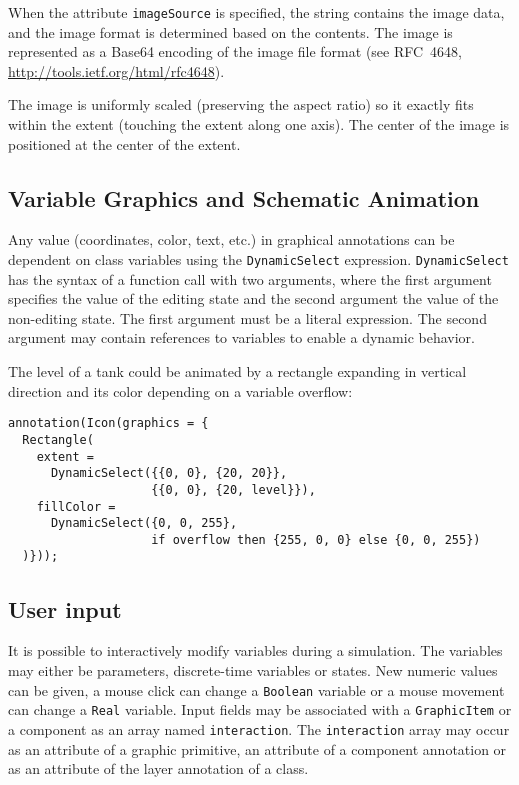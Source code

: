 When the attribute \lstinline!imageSource! is specified, the string contains the
image data, and the image format is determined based on the contents.
The image is represented as a Base64 encoding of the image file format
(see RFC~4648, \url{http://tools.ietf.org/html/rfc4648}).

The image is uniformly scaled (preserving the aspect ratio) so it exactly fits within the extent (touching the
extent along one axis).  The center of the image is positioned at the center of the extent.

\subsection{Variable Graphics and Schematic Animation}\label{variable-graphics-and-schematic-animation}

Any value (coordinates, color, text, etc.) in graphical annotations can
be dependent on class variables using the \lstinline!DynamicSelect! expression.
\lstinline!DynamicSelect! has the syntax of a function call with two arguments,
where the first argument specifies the value of the editing state and
the second argument the value of the non-editing state. The first
argument must be a literal expression. The second argument may contain
references to variables to enable a dynamic behavior.

\begin{example}
The level of a tank could be animated by a rectangle expanding in vertical direction and its color depending on a variable overflow:
\begin{lstlisting}[language=modelica]
annotation(Icon(graphics = {
  Rectangle(
    extent =
      DynamicSelect({{0, 0}, {20, 20}},
                    {{0, 0}, {20, level}}),
    fillColor =
      DynamicSelect({0, 0, 255},
                    if overflow then {255, 0, 0} else {0, 0, 255})
  )}));
\end{lstlisting}
\end{example}

\subsection{User input}\label{user-input}

It is possible to interactively modify variables during a simulation.  The variables may either be parameters, discrete-time variables or states.  New numeric values can be given, a mouse click can change a \lstinline!Boolean! variable or a mouse movement can change a \lstinline!Real! variable.  Input fields may be associated with a \lstinline!GraphicItem! or a component as an array named \lstinline!interaction!.  The \lstinline!interaction! array may occur as an attribute of a graphic primitive, an attribute of a component annotation or as an attribute of the layer annotation of a class.

